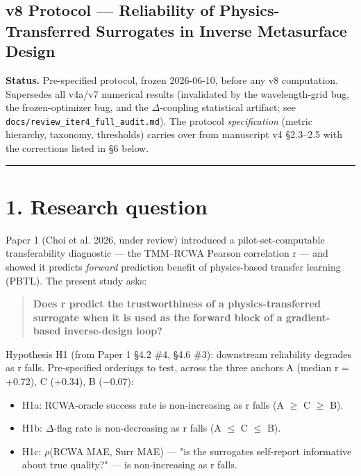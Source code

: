 \documentclass[11pt,a4paper]{article}
\providecommand{\tightlist}{\setlength{\itemsep}{0pt}\setlength{\parskip}{0pt}}
\begin{document}
\begingroup\small

\subsection*{v8 Protocol --- Reliability of Physics-Transferred Surrogates in Inverse Metasurface Design}

\textbf{Status.} Pre-specified protocol, frozen 2026-06-10, before any v8 computation.
Supersedes all v4a/v7 numerical results (invalidated by the wavelength-grid bug,
the frozen-optimizer bug, and the \ensuremath{\Delta}-coupling statistical artifact; see
\texttt{docs/\allowbreak{}review\_\allowbreak{}iter4\_\allowbreak{}full\_\allowbreak{}audit.\allowbreak{}md}). The protocol \emph{specification} (metric
hierarchy, taxonomy, thresholds) carries over from manuscript v4 \S{}2.3--2.5 with
the corrections listed in \S{}6 below.

\begin{center}\rule{0.5\linewidth}{0.5pt}\end{center}

\section*{1. Research question}

Paper 1 (Choi et al. 2026, under review) introduced a pilot-set-computable
transferability diagnostic --- the TMM--RCWA Pearson correlation r --- and showed
it predicts \emph{forward} prediction benefit of physics-based transfer learning
(PBTL). The present study asks:

\begin{quote}
\textbf{Does r predict the trustworthiness of a physics-transferred surrogate when
it is used as the forward block of a gradient-based inverse-design loop?}
\end{quote}

Hypothesis H1 (from Paper 1 \S{}4.2 \#4, \S{}4.6 \#3): downstream reliability degrades
as r falls. Pre-specified orderings to test, across the three anchors
A (median r = +0.72), C (+0.34), B (\ensuremath{-}0.07):

\begin{itemize}
\tightlist
\item
  H1a: RCWA-oracle success rate is non-increasing as r falls (A \ensuremath{\geq} C \ensuremath{\geq} B).
\item
  H1b: \ensuremath{\Delta}-flag rate is non-decreasing as r falls (A \ensuremath{\leq} C \ensuremath{\leq} B).
\item
  H1c: \ensuremath{\rho}(RCWA MAE, Surr MAE) --- "is the surrogate\textquotesingle s self-report informative
  about true quality?" --- is non-increasing as r falls.
\end{itemize}
\end{document}
